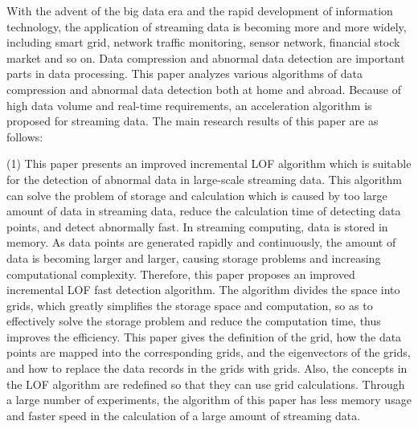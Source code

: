 \begin{englishabstract}

 With the advent of the big data era and the rapid development of information technology, the application of streaming data is becoming more and more widely, including smart grid, network traffic monitoring, sensor network, financial stock market and so on. Data compression and abnormal data detection are important parts in data processing. This paper analyzes various algorithms of data compression and abnormal data detection both at home and abroad. Because of high data volume and real-time requirements, an acceleration algorithm is proposed for streaming data. The main research results of this paper are as follows:
 
 (1) This paper presents an improved incremental LOF algorithm which is suitable for the detection of abnormal data in large-scale streaming data. This algorithm can solve the problem of storage and calculation which is caused by too large amount of data in streaming data, reduce the calculation time of detecting data points, and detect abnormally fast. In streaming computing, data is stored in memory. As data points are generated rapidly and continuously, the amount of data is becoming larger and larger, causing storage problems and increasing computational complexity. Therefore, this paper proposes an improved incremental LOF fast detection algorithm. The algorithm divides the space into grids, which greatly simplifies the storage space and computation, so as to effectively solve the storage problem and reduce the computation time, thus improves the efficiency. This paper gives the definition of the grid, how the data points are mapped into the corresponding grids, and the eigenvectors of the grids, and how to replace the data records in the grids with grids. Also, the concepts in the LOF algorithm are redefined so that they can use grid calculations. Through a large number of experiments, the algorithm of this paper has less memory usage and faster speed in the calculation of a large amount of streaming data.
 

\end{englishabstract}
